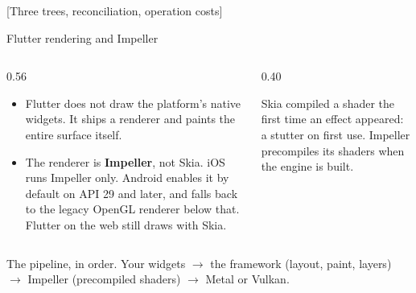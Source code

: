 \documentclass[10pt,aspectratio=169,t]{beamer}
\begin{document}
[Three trees, reconciliation, operation costs]

\begin{frame}[eyebrow=Rendering]{Flutter rendering and Impeller}
  \begin{columns}[T]
    \begin{column}{0.56\textwidth}
      \begin{itemize}
        \item Flutter does not draw the platform's native widgets. It ships a renderer and paints the entire surface itself.
        \item The renderer is \textbf{Impeller}, not Skia. iOS runs Impeller only. Android enables it by default on API 29 and later, and falls back to the legacy OpenGL renderer below that. Flutter on the web still draws with Skia.
      \end{itemize}
    \end{column}
    \begin{column}{0.40\textwidth}
      \begin{hint}
        Skia compiled a shader the first time an effect appeared: a stutter on first use. Impeller precompiles its shaders when the engine is built.
      \end{hint}
    \end{column}
  \end{columns}
  \begin{takeaway}{The pipeline, in order.}
    Your widgets \(\rightarrow\) the framework (layout, paint, layers) \(\rightarrow\) Impeller (precompiled shaders) \(\rightarrow\) Metal or Vulkan.
  \end{takeaway}
\end{frame}
\end{document}
